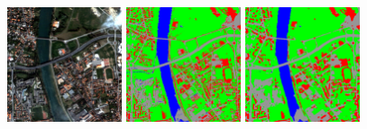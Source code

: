 \begin{figure}[!h]
  \center
  \includegraphics[width=0.3\textwidth]{../Art/MonteverdiImages/classification_chain_inputimage.jpg}
  \includegraphics[width=0.3\textwidth]{../Art/MonteverdiImages/classification_chain_fancyclassif_CMR_input.png}
  \includegraphics[width=0.3\textwidth]{../Art/MonteverdiImages/classification_chain_fancyclassif_CMR_3.png}
  \label{fig:ClassificationMapRegularizationApplication}
\end{figure}







